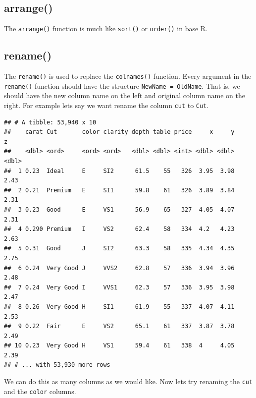 \documentclass[
]{book}
\newenvironment{Shaded}{\begin{snugshade}}{\end{snugshade}}
\newcommand{\DataTypeTok}[1]{\textcolor[rgb]{0.13,0.29,0.53}{#1}}
\newcommand{\KeywordTok}[1]{\textcolor[rgb]{0.13,0.29,0.53}{\textbf{#1}}}
\newcommand{\NormalTok}[1]{#1}
\newcommand{\OperatorTok}[1]{\textcolor[rgb]{0.81,0.36,0.00}{\textbf{#1}}}
\newcommand{\StringTok}[1]{\textcolor[rgb]{0.31,0.60,0.02}{#1}}
\begin{document}
\hypertarget{arrange}{%
\subsection{arrange()}\label{arrange}}

The \texttt{arrange()} function is much like \texttt{sort()} or \texttt{order()} in base R.

\hypertarget{rename}{%
\subsection{rename()}\label{rename}}

The \texttt{rename()} is used to replace the \texttt{colnames()} function. Every argument in the \texttt{rename()} function should have the structure \texttt{NewName\ =\ OldName}. That is, we should have the new column name on the left and original column name on the right. For example lets say we want rename the column \texttt{cut} to \texttt{Cut}.

\begin{Shaded}
\end{Shaded}

\begin{verbatim}
## # A tibble: 53,940 x 10
##    carat Cut       color clarity depth table price     x     y     z
##    <dbl> <ord>     <ord> <ord>   <dbl> <dbl> <int> <dbl> <dbl> <dbl>
##  1 0.23  Ideal     E     SI2      61.5    55   326  3.95  3.98  2.43
##  2 0.21  Premium   E     SI1      59.8    61   326  3.89  3.84  2.31
##  3 0.23  Good      E     VS1      56.9    65   327  4.05  4.07  2.31
##  4 0.290 Premium   I     VS2      62.4    58   334  4.2   4.23  2.63
##  5 0.31  Good      J     SI2      63.3    58   335  4.34  4.35  2.75
##  6 0.24  Very Good J     VVS2     62.8    57   336  3.94  3.96  2.48
##  7 0.24  Very Good I     VVS1     62.3    57   336  3.95  3.98  2.47
##  8 0.26  Very Good H     SI1      61.9    55   337  4.07  4.11  2.53
##  9 0.22  Fair      E     VS2      65.1    61   337  3.87  3.78  2.49
## 10 0.23  Very Good H     VS1      59.4    61   338  4     4.05  2.39
## # ... with 53,930 more rows
\end{verbatim}

We can do this as many columns as we would like. Now lets try renaming the \texttt{cut} and the \texttt{color} columns.
\end{document}
